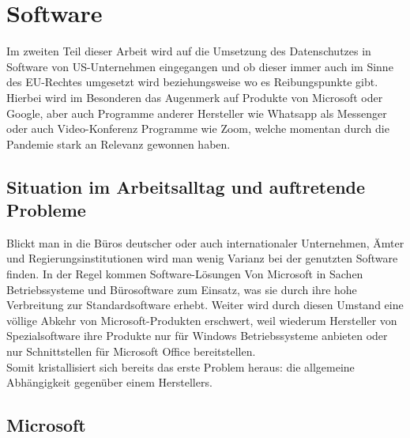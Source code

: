 \section{Software}
Im zweiten Teil dieser Arbeit wird auf die Umsetzung des Datenschutzes in Software von US-Unternehmen eingegangen und ob dieser immer auch im Sinne des EU-Rechtes umgesetzt wird beziehungsweise wo es Reibungspunkte gibt. Hierbei wird im Besonderen das Augenmerk auf Produkte von Microsoft oder Google, aber auch Programme anderer Hersteller wie Whatsapp als Messenger oder auch Video-Konferenz Programme wie Zoom, welche momentan durch die Pandemie stark an Relevanz gewonnen haben.

\subsection{Situation im Arbeitsalltag und auftretende Probleme}
Blickt man in die Büros deutscher oder auch internationaler Unternehmen, Ämter und Regierungsinstitutionen wird man wenig Varianz bei der genutzten Software finden. In der Regel kommen Software-Lösungen Von Microsoft in Sachen Betriebssysteme und Bürosoftware zum Einsatz, was sie durch ihre hohe Verbreitung zur Standardsoftware erhebt. Weiter wird durch diesen Umstand eine völlige Abkehr von Microsoft-Produkten erschwert, weil wiederum Hersteller von Spezialsoftware ihre Produkte nur für Windows Betriebssysteme anbieten oder nur Schnittstellen für Microsoft Office bereitstellen.\\
Somit kristallisiert sich bereits das erste Problem heraus: die allgemeine Abhängigkeit gegenüber einem Herstellers. \\

\subsection{Microsoft}

